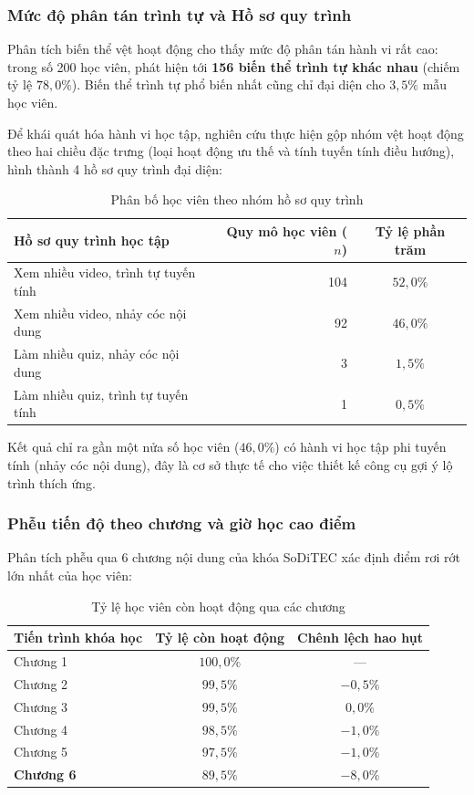 \subsubsection{Mức độ phân tán trình tự và Hồ sơ quy trình}
Phân tích biến thể vệt hoạt động cho thấy mức độ phân tán hành vi rất cao: trong số 200 học viên, phát hiện tới \textbf{156 biến thể trình tự khác nhau} (chiếm tỷ lệ $78,0\%$). Biến thể trình tự phổ biến nhất cũng chỉ đại diện cho $3,5\%$ mẫu học viên.

Để khái quát hóa hành vi học tập, nghiên cứu thực hiện gộp nhóm vệt hoạt động theo hai chiều đặc trưng (loại hoạt động ưu thế và tính tuyến tính điều hướng), hình thành 4 hồ sơ quy trình đại diện:

\begin{table}[H]
\centering
\caption{Phân bố học viên theo nhóm hồ sơ quy trình}
\label{tab:phan_bo_ho_so}
\begin{tabular}{lrc}
\toprule
\textbf{Hồ sơ quy trình học tập} & \textbf{Quy mô học viên ($n$)} & \textbf{Tỷ lệ phần trăm} \\
\midrule
Xem nhiều video, trình tự tuyến tính & 104 & $52,0\%$ \\
Xem nhiều video, nhảy cóc nội dung & 92 & $46,0\%$ \\
Làm nhiều quiz, nhảy cóc nội dung & 3 & $1,5\%$ \\
Làm nhiều quiz, trình tự tuyến tính & 1 & $0,5\%$ \\
\bottomrule
\end{tabular}
\end{table}

Kết quả chỉ ra gần một nửa số học viên ($46,0\%$) có hành vi học tập phi tuyến tính (nhảy cóc nội dung), đây là cơ sở thực tế cho việc thiết kế công cụ gợi ý lộ trình thích ứng.

\subsubsection{Phễu tiến độ theo chương và giờ học cao điểm}
Phân tích phễu qua 6 chương nội dung của khóa SoDiTEC xác định điểm rơi rớt lớn nhất của học viên:

\begin{table}[H]
\centering
\caption{Tỷ lệ học viên còn hoạt động qua các chương}
\label{tab:ty_le_hoat_dong_chuong}
\begin{tabular}{lcc}
\toprule
\textbf{Tiến trình khóa học} & \textbf{Tỷ lệ còn hoạt động} & \textbf{Chênh lệch hao hụt} \\
\midrule
Chương 1 & $100,0\%$ & — \\
Chương 2 & $99,5\%$ & $-0,5\%$ \\
Chương 3 & $99,5\%$ & $0,0\%$ \\
Chương 4 & $98,5\%$ & $-1,0\%$ \\
Chương 5 & $97,5\%$ & $-1,0\%$ \\
\textbf{Chương 6} & \textbf{$89,5\%$} & \textbf{$-8,0\%$} \\
\bottomrule
\end{tabular}
\end{table}

